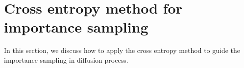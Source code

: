 \documentclass[final]{siamltex}
\newtheorem{remark}{Remark}
\begin{document}
\begin{comment}
\begin{remark}
  Since $I_2$ is simply the Stratonovich version of $I_1$, we use $I_1$ for
  simplicity.
  Starting from dynamics
\begin{align}
\begin{split}
  d z_s &= \widetilde{b}(z_s) ds + \sqrt{2\beta^{-1}} d\widetilde{w}_s, \quad s >0  \\
  z_0&=z
  \end{split}
\label{dynamics-11}
\end{align}
the above argument can be repeated to get 
\begin{align}
  d\widetilde{\mu} &=\exp\Big(- \frac{\beta}{4}\int_0^\tau \Big|\frac{dz}{ds} -
  \widetilde{b}(z_s)\Big|^2 ds\Big) d\nu
  \label{measure-2}
\end{align}
Divided it by (\ref{measure-1}), we have
\begin{align}
  \frac{d\widetilde{\mu}}{d\mu} = \exp\Big(- \frac{\beta}{4}\Big[2\int_0^\tau (dz_s,
  b(z_s) - \widetilde{b}(z_s)) + \int_0^\tau (|\widetilde{b}(z_s)|^2 - |b(z_s)|^2) ds\Big]
  \Big)
\end{align}
Then we substitute the dynamics (\ref{dynamics-1}) in above (in principle we
can also use dynamics (\ref{dynamics-11}), but $\widetilde{w}$ is not Brownian motion
under $\mu$ ...), after
simplification, we have 
\begin{align}
  \frac{d\widetilde{\mu}}{d\mu} = \exp\Big(-
  \frac{\beta^{1/2}}{\sqrt{2}}\int_0^\tau (dw_s,
b(z_s) - \widetilde{b}(z_s)) - \frac{\beta}{4}\int_0^\tau (|\widetilde{b}(z_s)
- b(z_s)|^2) ds\Big)
\end{align}
Let $u_s = \frac{1}{\sqrt{2}} (b(z_s) - \widetilde{b}(z_s))$, it gives
\begin{align}
  \frac{d\widetilde{\mu}}{d\mu} = \exp\Big(- \beta^{1/2}\int_0^\tau (dw_s, u_s)
) - \frac{\beta}{2}\int_0^\tau |u_s|^2 ds\Big)
\end{align}
So we recover the more general situation in our IS paper for $\sigma =
\sqrt{2}$.
\end{remark}
\end{comment}
\section{Cross entropy method for importance sampling}
\label{sec-ce-is}
In this section, we discuss how to apply the cross entropy
method \cite{ce_tutorial, ce_book} to guide the
importance sampling in diffusion process.
\end{document}
